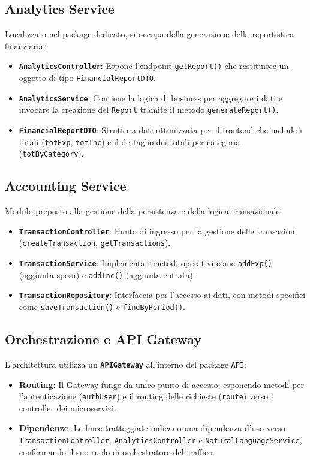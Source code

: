 \subsection{Analytics Service}
Localizzato nel package dedicato, si occupa della generazione della reportistica finanziaria:
\begin{itemize}
    \item \textbf{\texttt{AnalyticsController}}: Espone l'endpoint \texttt{getReport()} che restituisce un oggetto di tipo \texttt{FinancialReportDTO}.
    \item \textbf{\texttt{AnalyticsService}}: Contiene la logica di business per aggregare i dati e invocare la creazione del \texttt{Report} tramite il metodo \texttt{generateReport()}.
    \item \textbf{\texttt{FinancialReportDTO}}: Struttura dati ottimizzata per il frontend che include i totali (\texttt{totExp}, \texttt{totInc}) e il dettaglio dei totali per categoria (\texttt{totByCategory}).
\end{itemize}

\subsection{Accounting Service}
Modulo preposto alla gestione della persistenza e della logica transazionale:
\begin{itemize}
    \item \textbf{\texttt{TransactionController}}: Punto di ingresso per la gestione delle transazioni (\texttt{createTransaction}, \texttt{getTransactions}).
    \item \textbf{\texttt{TransactionService}}: Implementa i metodi operativi come \texttt{addExp()} (aggiunta spesa) e \texttt{addInc()} (aggiunta entrata).
    \item \textbf{\texttt{TransactionRepository}}: Interfaccia per l'accesso ai dati, con metodi specifici come \texttt{saveTransaction()} e \texttt{findByPeriod()}.
\end{itemize}

\subsection{Orchestrazione e API Gateway}
L'architettura utilizza un \textbf{\texttt{APIGateway}} all'interno del package \texttt{API}:
\begin{itemize}
    \item \textbf{Routing}: Il Gateway funge da unico punto di accesso, esponendo metodi per l'autenticazione (\texttt{authUser}) e il routing delle richieste (\texttt{route}) verso i controller dei microservizi.
    \item \textbf{Dipendenze}: Le linee tratteggiate indicano una dipendenza d'uso verso \\ \texttt{TransactionController}, \texttt{AnalyticsController} e \texttt{NaturalLanguageService}, confermando il suo ruolo di orchestratore del traffico.
\end{itemize}

